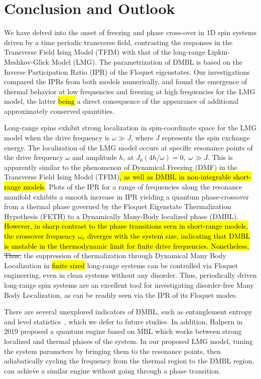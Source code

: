 \documentclass[%
reprint,
superscriptaddress,
amsmath,amssymb,
aps,
prb,
showkeys,
]{revtex4-2}
\begin{document}
\section{\label{sec:level7}Conclusion and Outlook}
We have delved into the onset of freezing and phase cross-over in 1D spin systems driven by a time periodic transverse field, contrasting the responses in the Transverse Field Ising Model (TFIM) with that of the long-range Lipkin-Meshkov-Glick Model (LMG). The parametrization of DMBL is based on the Inverse Participation Ratio (IPR) of the Floquet eigenstates. Our investigations compared the IPRs from both models numerically, and found the emergence of thermal behavior at low frequencies and freezing at high frequencies for the LMG model, the latter \hl{being} a direct consequence of the appearance of additional approximately conserved quantities.

Long-range spins exhibit strong localization in spin-coordinate space for the LMG model when the drive frequency is $\omega \gg J$, where $J$ represents the spin exchange energy. The localization of the LMG model occurs at specific resonance points of the drive frequency $\omega$ and amplitude $h$, at $J_0(4h/\omega)=0,\; \omega \gg J$. This is apparently similar to the phenomenon of Dynamical Freezing (DMF) in the Transverse Field Ising Model (TFIM)\hl{, as well as DMBL in non-integrable short-range models}. Plots of the IPR for a range of frequencies along the resonance manifold exhibits a smooth increase in IPR yielding a quantum phase-crossover from a thermal phase governed by the Floquet Eigenstate Thermalization Hypothesis (FETH) to a Dynamically Many-Body localized phase (DMBL). \hl{However, in sharp contrast to the phase transitions seen in short-range models, the crossover frequency $\omega_c$ diverges with the system size, indicating that DMBL is unstable in the thermodynamic limit for finite drive frequencies. Nonetheless,} \sout{Thus,} the suppression  of thermalization through  Dynamical Many Body Localization in \hl{finite sized} long-range systems can be controlled via Floquet engineering, even in clean systems without any disorder.	Thus, periodically driven long-range spin systems are an excellent tool for investigating disorder-free Many Body Localization, as can be readily seen via the IPR of its Floquet modes.


There are several unexplored indicators of DMBL, such as entanglement entropy and level statistics~\cite{khemani_phase_2016}, which we defer to future studies. In addition, Halpern in 2019 proposed a quantum engine based on MBL\cite{yunger_halpern_quantum_2019} which works  between strong localized and thermal phases of the system. In our proposed LMG model, tuning the system parameters by bringing them to the resonance points, then adiabatically cycling the frequency from the thermal region to the DMBL region, can achieve a similar engine without going through a phase transition. 
\end{document}
